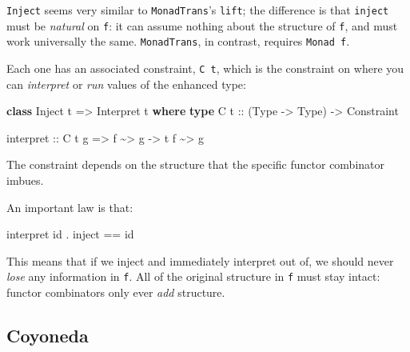 \documentclass[]{article}
\newenvironment{Shaded}{}{}
\newcommand{\DataTypeTok}[1]{\textcolor[rgb]{0.56,0.13,0.00}{#1}}
\newcommand{\FunctionTok}[1]{\textcolor[rgb]{0.02,0.16,0.49}{#1}}
\newcommand{\KeywordTok}[1]{\textcolor[rgb]{0.00,0.44,0.13}{\textbf{#1}}}
\newcommand{\NormalTok}[1]{#1}
\newcommand{\OperatorTok}[1]{\textcolor[rgb]{0.40,0.40,0.40}{#1}}
\newcommand{\OtherTok}[1]{\textcolor[rgb]{0.00,0.44,0.13}{#1}}
\begin{document}
\texttt{Inject} seems very similar to \texttt{MonadTrans}'s \texttt{lift}; the
difference is that \texttt{inject} must be \emph{natural} on \texttt{f}: it can
assume nothing about the structure of \texttt{f}, and must work universally the
same. \texttt{MonadTrans}, in contrast, requires \texttt{Monad\ f}.

Each one has an associated constraint, \texttt{C\ t}, which is the constraint on
where you can \emph{interpret} or \emph{run} values of the enhanced type:

\begin{Shaded}
\begin{Highlighting}[]
\KeywordTok{class} \DataTypeTok{Inject}\NormalTok{ t }\OtherTok{=>} \DataTypeTok{Interpret}\NormalTok{ t }\KeywordTok{where}
    \KeywordTok{type} \DataTypeTok{C}\OtherTok{ t ::}\NormalTok{ (}\DataTypeTok{Type} \OtherTok{{-}>} \DataTypeTok{Type}\NormalTok{) }\OtherTok{{-}>} \DataTypeTok{Constraint}

\NormalTok{    interpret}
\OtherTok{        ::} \DataTypeTok{C}\NormalTok{ t g}
        \OtherTok{=>}\NormalTok{ f }\OperatorTok{\textasciitilde{}>}\NormalTok{ g}
        \OtherTok{{-}>}\NormalTok{ t f }\OperatorTok{\textasciitilde{}>}\NormalTok{ g}
\end{Highlighting}
\end{Shaded}

The constraint depends on the structure that the specific functor combinator
imbues.

An important law is that:

\begin{Shaded}
\begin{Highlighting}[]
\NormalTok{interpret }\FunctionTok{id} \OperatorTok{.}\NormalTok{ inject }\OperatorTok{==} \FunctionTok{id}
\end{Highlighting}
\end{Shaded}

This means that if we inject and immediately interpret out of, we should never
\emph{lose} any information in \texttt{f}. All of the original structure in
\texttt{f} must stay intact: functor combinators only ever \emph{add} structure.

\hypertarget{coyoneda}{%
\subsection{Coyoneda}\label{coyoneda}}
\end{document}
